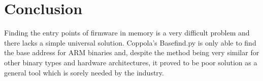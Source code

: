 \documentclass[letterpaper,twocolumn,10pt]{article}
\begin{document}
\section{Conclusion}
Finding the entry points of firmware in memory is a very difficult problem and there lacks a simple universal solution. Coppola's Basefind.py is only able to find the base address for ARM binaries and, despite the method being very similar for other binary types and hardware architectures, it proved to be poor solution as a general tool which is sorely needed by the industry.



\end{document}
